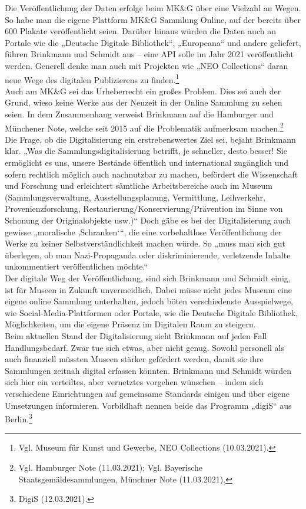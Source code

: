 \documentclass[a4paper,12pt,ngerman]{article}
\begin{document}
Die Veröffentlichung der Daten erfolge beim MK\&G über eine Vielzahl an Wegen. So habe man die eigene Plattform MK\&G Sammlung Online, auf der bereits über 600 Plakate veröffentlicht seien. Darüber hinaus würden die Daten auch an Portale wie die „Deutsche Digitale Bibliothek“, „Europeana“ und andere geliefert, führen Brinkmann und Schmidt aus – eine API solle im Jahr 2021 veröffentlicht werden. Generell denke man auch mit Projekten wie „NEO Collections“ daran neue Wege des digitalen Publizierens zu finden.\footnote{Vgl. Museum für Kunst und Gewerbe, NEO Collections (10.03.2021).} \\
Auch am MK\&G sei das Urheberrecht ein großes Problem. Dies sei auch der Grund, wieso keine Werke aus der Neuzeit in der Online Sammlung zu sehen seien. In dem Zusammenhang verweist Brinkmann auf die Hamburger und Münchener Note, welche seit 2015 auf die Problematik aufmerksam machen.\footnote{Vgl. Hamburger Note (11.03.2021); Vgl. Bayerische Staatsgemäldesammlungen, Münchner Note (11.03.2021).} \\
Die Frage, ob die Digitalisierung ein erstrebenswertes Ziel sei, bejaht Brinkmann klar. „Was die Sammlungsdigitalisierung betrifft, je schneller, desto besser! Sie ermöglicht es uns, unsere Bestände öffentlich und international zugänglich und sofern rechtlich möglich auch nachnutzbar zu machen, befördert die Wissenschaft und Forschung und erleichtert sämtliche Arbeitsbereiche auch im Museum (Sammlungsverwaltung, Ausstellungsplanung, Vermittlung, Leihverkehr, Provenienzforschung, Restaurierung/Konservierung/Prävention im Sinne von Schonung der Originalobjekte usw.)“ Doch gäbe es bei der Digitalisierung auch gewisse „moralische ‚Schranken‘“, die eine vorbehaltlose Veröffentlichung der Werke zu keiner Selbstverständlichkeit machen würde. So „muss man sich gut überlegen, ob man Nazi-Propaganda oder diskriminierende, verletzende Inhalte unkommentiert veröffentlichen möchte.“ \\
Der digitale Weg der Veröffentlichung, sind sich Brinkmann und Schmidt einig, ist für Museen in Zukunft unvermeidlich. Dabei müsse nicht jedes Museum eine eigene online Sammlung unterhalten, jedoch böten verschiedenste Ausspielwege, wie Social-Media-Plattformen oder Portale, wie die Deutsche Digitale Bibliothek, Möglichkeiten, um die eigene Präsenz im Digitalen Raum zu steigern. \\
Beim aktuellen Stand der Digitalisierung sieht Brinkmann auf jeden Fall Handlungsbedarf. Zwar tue sich etwas, aber nicht genug. Sowohl personell als auch finanziell müssten Museen stärker gefördert werden, damit sie ihre Sammlungen zeitnah digital erfassen könnten. Brinkmann und Schmidt würden sich hier ein verteiltes, aber vernetztes vorgehen wünschen – indem sich verschiedene Einrichtungen auf gemeinsame Standards einigen und über eigene Umsetzungen informieren. Vorbildhaft nennen beide das Programm „digiS“ aus Berlin.\footnote{DigiS (12.03.2021).} \\
\end{document}
